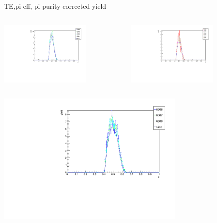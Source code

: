 \begin{frame}{TE,pi eff, pi purity corrected yield}
\begin{columns}
\begin{column}[T]{0.5\textwidth}
\includegraphics[width = 0.7\textwidth]{results/yield/check/yieldcheck_220_neg.pdf}
\end{column}
\begin{column}[T]{0.5\textwidth}
\includegraphics[width = 0.7\textwidth]{results/yield/check/yieldcheck_220_pos.pdf}
\end{column}
\end{columns}
\begin{columns}
\begin{column}[T]{0.5\textwidth}
\includegraphics[width = 0.7\textwidth]{results/yield/check/yieldcheck_210_neg.pdf}

\end{column}
\end{columns}
\end{frame}

